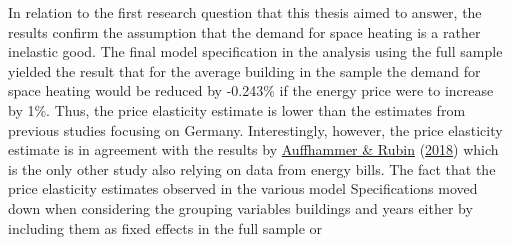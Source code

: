 \documentclass[12pt,twoside]{reedthesis}
\begin{document}
In relation to the first research question that this thesis aimed to answer, the results confirm the assumption that the demand for space heating is a rather inelastic good. The final model specification in the analysis using the full sample yielded the result that for the average building in the sample the demand for space heating would be reduced by -0.243\% if the energy price were to increase by 1\%. Thus, the price elasticity estimate is lower than the estimates from previous studies focusing on Germany. Interestingly, however, the price elasticity estimate is in agreement with the results by \protect\hyperlink{ref-auffhammer_rubin18}{Auffhammer \& Rubin} (\protect\hyperlink{ref-auffhammer_rubin18}{2018}) which is the only other study also relying on data from energy bills. The fact that the price elasticity estimates observed in the various model Specifications moved down when considering the grouping variables buildings and years either by including them as fixed effects in the full sample or
\end{document}
